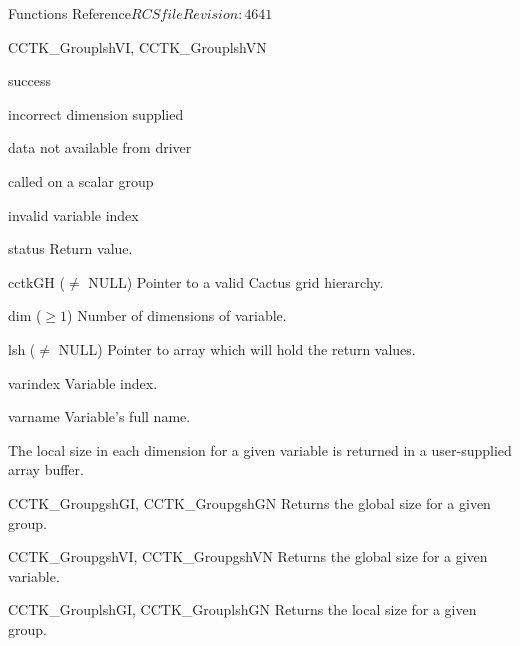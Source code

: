 \begin{cactuspart}{ Functions Reference}{$RCSfile$}{$Revision: 4641 $}
\begin{FunctionDescription}{CCTK\_GrouplshVI, CCTK\_GrouplshVN}
\begin{ResultSection}
\begin{Result}{0} success \end{Result}
\begin{Result}{-1} incorrect dimension supplied \end{Result}
\begin{Result}{-2} data not available from driver \end{Result}
\begin{Result}{-3} called on a scalar group \end{Result}
\begin{Result}{-4} invalid variable index \end{Result}
\end{ResultSection}

\begin{ParameterSection}
\begin{Parameter}{status} Return value. \end{Parameter}
\begin{Parameter}{cctkGH ($\ne$ NULL)} Pointer to a valid Cactus grid hierarchy. \end{Parameter}
\begin{Parameter}{dim ($\ge 1$)} Number of dimensions of variable. \end{Parameter}
\begin{Parameter}{lsh ($\ne$ NULL)} Pointer to array which will hold the return values. \end{Parameter}
\begin{Parameter}{varindex} Variable index. \end{Parameter}
\begin{Parameter}{varname} Variable's full name. \end{Parameter}
\end{ParameterSection}

\begin{Discussion}
The local size in each dimension for a given variable is returned in a user-supplied array buffer.
\end{Discussion}

\begin{SeeAlsoSection}
\begin{SeeAlso}{CCTK\_GroupgshGI, CCTK\_GroupgshGN}
Returns the global size for a given group.
\end{SeeAlso}
\begin{SeeAlso}{CCTK\_GroupgshVI, CCTK\_GroupgshVN}
Returns the global size for a given variable.
\end{SeeAlso}
\begin{SeeAlso}{CCTK\_GrouplshGI, CCTK\_GrouplshGN}
Returns the local size for a given group.
\end{SeeAlso}
\end{SeeAlsoSection}
\end{FunctionDescription}



\end{cactuspart}
